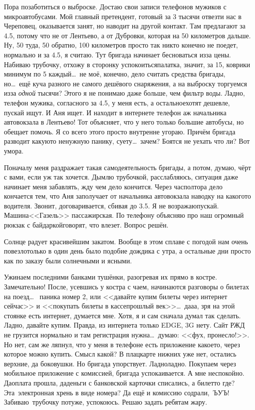 Пора позаботиться о выброске. Достаю свои записи телефонов мужиков с микроавтобусами. Мой главный претендент, готовый за 3 тысячи отвезти нас в Череповец, оказывается занят, но наводит на другой контакт. Там предлагают за 4.5, потому что не от Лентьево, а от Дубровки, которая на 50 километров дальше. Ну, 50 туда, 50 обратно, 100 километров просто так никто конечно не поедет, нормально и за 4.5, я считаю. Тут бригада начинает бесноваться из\sdash за цены. Набиваю трубочку, отхожу в сторонку успокоиться\mdash палатка, значит, за 15, коврики минимум по 5 каждый\ldots~не моё, конечно, дело считать средства бригады, но\ldots~ещё куча разного не самого дешёвого снаряжения, а на выброску торгуемся из\sdash за \textit{одной} тысячи? Этого я не понимаю даже больше, чем фильтр воды. Ладно, телефон  мужика, согласного за 4.5, у  меня есть, а остальное\mdash хотят дешевле, пускай ищут. И Аня ищет. И находит в интернете телефон аж начальника автовокзала в Лентьево! Тот объясняет, что у него только большие автобусы, но обещает помочь. Я со всего этого просто внутренне угораю. Причём бригада разводит какую\sdash то ненужную панику, суету\ldots~зачем? Боятся не уехать что ли? Вот умора.

Поначалу меня раздражает такая самодеятельность бригады, а потом, думаю, чёрт с вами, если уж так хочется. Дымлю трубочкой, расслабляюсь, ситуация даже начинает меня забавлять, жду чем дело кончится. Через час\sdash полтора дело кончается тем, что Аня заполучает от начальника автовокзала наводку на какого\sdash то водителя. Звонит, договаривается, сбивая до 3.5. Я не возражаю\mdash пускай. Машина\mdash <<Газель>> пассажирская. По телефону объясняю про наш огромный рюкзак с байдаркой\mdash говорят, что влезет. Вопрос решён.

Солнце радует красивейшим закатом. Вообще в этом сплаве с погодой нам очень повезло\mdash только в один день было подобие дождика с утра, а остальные дни просто как по заказу были солнечными и ясными.

Ужинаем последними банками тушёнки, разогревая их прямо в костре. Замечательно! После, усевшись у костра с чаем, начинаются разговоры о билетах на поезд\ldots~ паника номер 2, или <<давайте купим билеты через интернет сейчас>> и <<покупать билеты в кассе\mdash прошлый век>>\ldots~да\sdash а\sdash а, зря на этой стоянке есть интернет, думается мне. Хотя, я и сам сначала думал так сделать. Ладно, давайте купим. Правда, из интернета только EDGE, 3G нету. Сайт РЖД не грузится нормально и там регистрация нужна\ldots~думаю: <<фух, пронесло!>>. Но нет, сам же ляпнул, что у меня в телефоне есть приложение какое\sdash то, через которое можно купить. Смысл какой? В плацкарте нижних уже нет, остались верхние, да боковушки. Но бригада упорствует. Ладно\sdash ладно. Покупаем через мобильное приложение с комиссией, бригада успокаивается. А мне неспокойно. Да\mdash оплата прошла, да\mdash деньги с банковской карточки списались, а билет\sdash то где? Эта~электронная хрень в виде номера? Да ещё и комиссию содрали,~ЪУЪ! Забиваю~трубочку потуже, успокоюсь. Решаю задать ребятам жару.

